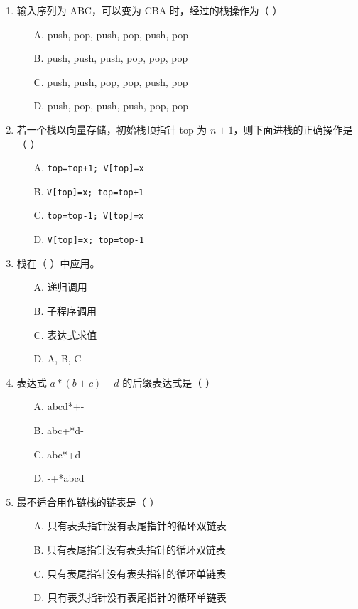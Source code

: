 \documentclass[12pt, a4paper]{article}
\begin{document}
\begin{enumerate}[label=\arabic*.]
	\item 输入序列为 ABC，可以变为 CBA 时，经过的栈操作为（ ）
	      \begin{enumerate}
		      \item[A.] push, pop, push, pop, push, pop
		      \item[B.] push, push, push, pop, pop, pop
		      \item[C.] push, push, pop, pop, push, pop
		      \item[D.] push, pop, push, push, pop, pop
	      \end{enumerate}

	\item 若一个栈以向量存储，初始栈顶指针 top 为 $n+1$，则下面进栈的正确操作是（ ）
	      \begin{enumerate}
		      \item[A.] \texttt{top=top+1; V[top]=x}
		      \item[B.] \texttt{V[top]=x; top=top+1}
		      \item[C.] \texttt{top=top-1; V[top]=x}
		      \item[D.] \texttt{V[top]=x; top=top-1}
	      \end{enumerate}

	\item 栈在（ ）中应用。
	      \begin{enumerate}
		      \item[A.] 递归调用
		      \item[B.] 子程序调用
		      \item[C.] 表达式求值
		      \item[D.] A, B, C
	      \end{enumerate}

	\item 表达式 $a*(b+c)-d$ 的后缀表达式是（ ）
	      \begin{enumerate}
		      \item[A.] abcd*+-
		      \item[B.] abc+*d-
		      \item[C.] abc*+d-
		      \item[D.] -+*abcd
	      \end{enumerate}

	\item 最不适合用作链栈的链表是（ ）
	      \begin{enumerate}
		      \item[A.] 只有表头指针没有表尾指针的循环双链表
		      \item[B.] 只有表尾指针没有表头指针的循环双链表
		      \item[C.] 只有表尾指针没有表头指针的循环单链表
		      \item[D.] 只有表头指针没有表尾指针的循环单链表
	      \end{enumerate}


\end{enumerate}
\end{document}
